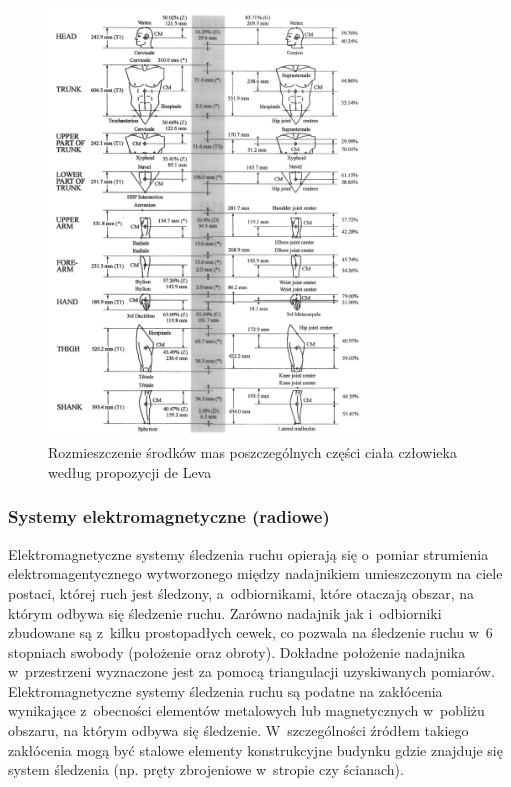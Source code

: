 \begin{figure}[!htp]
	\centering	
	\includegraphics[width=0.75\textwidth]{images/centerOfMass.png}
	\caption{Rozmieszczenie środków mas poszczególnych części ciała człowieka według propozycji de Leva\cite{DeLeva1996}}	
	\label{fig:centerOfMass}	
\end{figure}

\subsubsection*{Systemy elektromagnetyczne (radiowe)}
Elektromagnetyczne systemy śledzenia ruchu opierają się o~pomiar strumienia elektromagentycznego wytworzonego między nadajnikiem umieszczonym na ciele postaci, której ruch jest śledzony, a~odbiornikami, które otaczają obszar, na którym odbywa się śledzenie ruchu. Zarówno nadajnik jak i~odbiorniki zbudowane są z~kilku prostopadłych cewek, co pozwala na śledzenie ruchu w~6 stopniach swobody (położenie oraz obroty). Dokładne położenie nadajnika w~przestrzeni wyznaczone jest za pomocą triangulacji uzyskiwanych pomiarów. Elektromagnetyczne systemy śledzenia ruchu są podatne na zakłócenia wynikające z~obecności elementów metalowych lub magnetycznych w~pobliżu obszaru, na którym odbywa się śledzenie. W~szczególności źródłem  takiego zakłócenia mogą być stalowe elementy konstrukcyjne budynku gdzie znajduje się system śledzenia (np. pręty zbrojeniowe w~stropie czy ścianach). 

